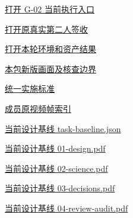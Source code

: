 \documentclass[11pt,a4paper]{article}
\begin{document}
\href{file:///D:/Agent/srp/agent/tasks/G-02/execution/verify.py}{打开 G-\allowbreak{}02 当前执行入口}


\href{file:///D:/Agent/srp/agent/modules/data-governance/G-02_\%E7\%AC\%AC\%E4\%BA\%8C\%E4\%BA\%BA\%E5\%AE\%A1\%E6\%A0\%B8\%E6\%8A\%A5\%E5\%91\%8A_\%E5\%B7\%B2\%E7\%AD\%BE\%E7\%BD\%B2.md}{打开原真实第二人签收}


\href{file:///D:/Agent/srp/agent/tasks/G-02/evidence/verification.json}{打开本轮环境和资产结果}


\href{file:///D:/Agent/srp/agent/tasks/G-02/outputs/current-implementation-evidence.md}{本包新版画面及核查边界}


\href{file:///D:/Agent/srp/agent/design/weather/2026-10-08_Storm\%E4\%B8\%8E\%E7\%BA\%AF\%E7\%B2\%92\%E5\%AD\%90\%E5\%8F\%8C\%E7\%8E\%AF\%E5\%AE\%9E\%E6\%96\%BD\%E6\%A0\%87\%E5\%87\%86.md}{统一实施标准}


\href{file:///D:/Agent/srp/human/assets/previews/2026-10-08/member-storm-particle-rings/frame-index.json}{成员原视频帧索引}


\href{file:///D:/Agent/srp/agent/design/design-foundation-20261008/task-baseline.json}{当前设计基线 task-\allowbreak{}baseline.json}


\href{file:///D:/Agent/srp/agent/design/design-foundation-20261008/01-design.pdf}{当前设计基线 01-\allowbreak{}design.pdf}


\href{file:///D:/Agent/srp/agent/design/design-foundation-20261008/02-science.pdf}{当前设计基线 02-\allowbreak{}science.pdf}


\href{file:///D:/Agent/srp/agent/design/design-foundation-20261008/03-decisions.pdf}{当前设计基线 03-\allowbreak{}decisions.pdf}


\href{file:///D:/Agent/srp/agent/design/design-foundation-20261008/04-review-audit.pdf}{当前设计基线 04-\allowbreak{}review-\allowbreak{}audit.pdf}
\end{document}
